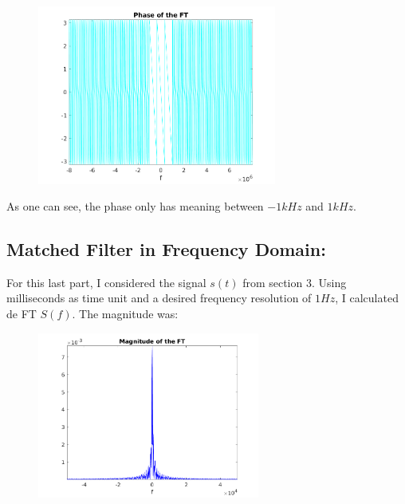 \documentclass[a4paper,11pt]{article}
\begin{document}
\begin{figure}[!hp]
    \begin{center}
      \includegraphics[width=0.7\textwidth]{images/exercice_4b.png}
    \end{center}
\end{figure}

As one can see, the phase only has meaning between $-1kHz$ and $1kHz$.

\subsection{Matched Filter in Frequency Domain:}

For this last part, I considered the signal $s(t)$ from section 3. Using milliseconds as time unit and a desired frequency resolution of $1Hz$, I calculated de FT $S(f)$. The magnitude was:

\begin{figure}[!hp]
    \begin{center}
      \includegraphics[width=0.65\textwidth]{images/exercice_5a.png}
    \end{center}
\end{figure}
\end{document}
